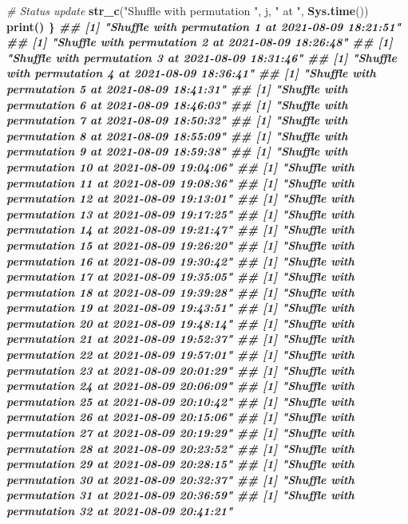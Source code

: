\documentclass[12pt]{article}
\newenvironment{Shaded}{\begin{snugshade}}{\end{snugshade}}
\newcommand{\CommentTok}[1]{\textcolor[rgb]{0.56,0.35,0.01}{\textit{#1}}}
\newcommand{\KeywordTok}[1]{\textcolor[rgb]{0.13,0.29,0.53}{\textbf{#1}}}
\newcommand{\NormalTok}[1]{#1}
\newcommand{\OperatorTok}[1]{\textcolor[rgb]{0.81,0.36,0.00}{\textbf{#1}}}
\newcommand{\StringTok}[1]{\textcolor[rgb]{0.31,0.60,0.02}{#1}}
\begin{document}
\begin{Shaded}
\begin{Highlighting}[]
{{{{{{{{{{{{{{{{{{{{{{{{{{{{{{{{    \CommentTok{# Status update}
    \KeywordTok{str_c}\NormalTok{(}\StringTok{"Shuffle with permutation "}\NormalTok{, j, }\StringTok{" at "}\NormalTok{, }\KeywordTok{Sys.time}\NormalTok{()) }\OperatorTok{%
\StringTok{        }\KeywordTok{print}\NormalTok{()}
\NormalTok{\}}
\CommentTok{## [1] "Shuffle with permutation 1 at 2021-08-09 18:21:51"}
\CommentTok{## [1] "Shuffle with permutation 2 at 2021-08-09 18:26:48"}
\CommentTok{## [1] "Shuffle with permutation 3 at 2021-08-09 18:31:46"}
\CommentTok{## [1] "Shuffle with permutation 4 at 2021-08-09 18:36:41"}
\CommentTok{## [1] "Shuffle with permutation 5 at 2021-08-09 18:41:31"}
\CommentTok{## [1] "Shuffle with permutation 6 at 2021-08-09 18:46:03"}
\CommentTok{## [1] "Shuffle with permutation 7 at 2021-08-09 18:50:32"}
\CommentTok{## [1] "Shuffle with permutation 8 at 2021-08-09 18:55:09"}
\CommentTok{## [1] "Shuffle with permutation 9 at 2021-08-09 18:59:38"}
\CommentTok{## [1] "Shuffle with permutation 10 at 2021-08-09 19:04:06"}
\CommentTok{## [1] "Shuffle with permutation 11 at 2021-08-09 19:08:36"}
\CommentTok{## [1] "Shuffle with permutation 12 at 2021-08-09 19:13:01"}
\CommentTok{## [1] "Shuffle with permutation 13 at 2021-08-09 19:17:25"}
\CommentTok{## [1] "Shuffle with permutation 14 at 2021-08-09 19:21:47"}
\CommentTok{## [1] "Shuffle with permutation 15 at 2021-08-09 19:26:20"}
\CommentTok{## [1] "Shuffle with permutation 16 at 2021-08-09 19:30:42"}
\CommentTok{## [1] "Shuffle with permutation 17 at 2021-08-09 19:35:05"}
\CommentTok{## [1] "Shuffle with permutation 18 at 2021-08-09 19:39:28"}
\CommentTok{## [1] "Shuffle with permutation 19 at 2021-08-09 19:43:51"}
\CommentTok{## [1] "Shuffle with permutation 20 at 2021-08-09 19:48:14"}
\CommentTok{## [1] "Shuffle with permutation 21 at 2021-08-09 19:52:37"}
\CommentTok{## [1] "Shuffle with permutation 22 at 2021-08-09 19:57:01"}
\CommentTok{## [1] "Shuffle with permutation 23 at 2021-08-09 20:01:29"}
\CommentTok{## [1] "Shuffle with permutation 24 at 2021-08-09 20:06:09"}
\CommentTok{## [1] "Shuffle with permutation 25 at 2021-08-09 20:10:42"}
\CommentTok{## [1] "Shuffle with permutation 26 at 2021-08-09 20:15:06"}
\CommentTok{## [1] "Shuffle with permutation 27 at 2021-08-09 20:19:29"}
\CommentTok{## [1] "Shuffle with permutation 28 at 2021-08-09 20:23:52"}
\CommentTok{## [1] "Shuffle with permutation 29 at 2021-08-09 20:28:15"}
\CommentTok{## [1] "Shuffle with permutation 30 at 2021-08-09 20:32:37"}
\CommentTok{## [1] "Shuffle with permutation 31 at 2021-08-09 20:36:59"}
\CommentTok{## [1] "Shuffle with permutation 32 at 2021-08-09 20:41:21"}
}}}}}}}}}}}}}}}}}}}}}}}}}}}}}}}}}
\end{Highlighting}
\end{Shaded}
\end{document}
